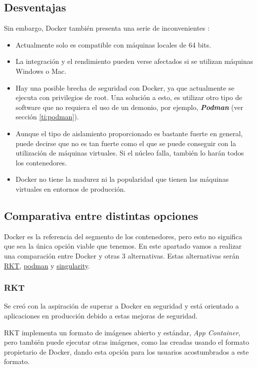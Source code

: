 \documentclass[11pt,a4paper]{article}
\begin{document}
\subsection{Desventajas}
Sin embargo, Docker también presenta una serie de inconvenientes \cite{merkel2014docker,rad2017introduction}: 
 \begin{itemize}
     \item Actualmente solo es compatible con máquinas locales de 64 bits.
     \item La integración y el rendimiento pueden verse afectados si se utilizan máquinas Windows o Mac.
     \item Hay una posible brecha de seguridad con Docker, ya que actualmente se ejecuta con privilegios de root. Una solución a esto, es utilizar otro tipo de software que no requiera el uso de un demonio, por ejemplo, {\textbf{\emph{Podman}}} (ver sección \ref{ti:podman}).
     \item Aunque el tipo de aislamiento proporcionado es bastante fuerte en general, puede decirse que no es tan fuerte como el que se puede conseguir con la utilización de máquinas virtuales. Si el núcleo falla, también lo harán todos los contenedores.
     \item Docker no tiene la madurez ni la popularidad que tienen las máquinas virtuales en entornos de producción.
 \end{itemize}     

\subsection{Comparativa entre distintas opciones}
Docker es la referencia del segmento de los contenedores, pero esto no significa que sea la única opción viable que tenemos. En este apartado vamos a realizar una comparación entre Docker y otras 3 alternativas. Estas alternativas serán \href{https://coreos.com/rkt/}{RKT}, \href{https://podman.io/whatis.html}{podman} y \href{https://singularity.lbl.gov/}{singularity}.
\subsubsection{RKT}
Se creó con la aspiración de superar a Docker en seguridad y está orientado a aplicaciones en producción debido a estas mejoras de seguridad.

RKT implementa un formato de imágenes abierto y estándar, \emph{App Container}, pero también puede
ejecutar otras imágenes, como las creadas usando el formato propietario de Docker, dando esta opción para los usuarios acostumbrados a este formato.
\end{document}
